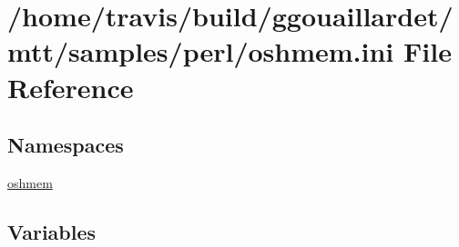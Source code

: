 \hypertarget{oshmem_8ini}{\section{/home/travis/build/ggouaillardet/mtt/samples/perl/oshmem.ini File Reference}
\label{oshmem_8ini}
}
\subsection*{Namespaces}
\begin{DoxyCompactItemize}
\item 
\hyperlink{namespaceoshmem}{oshmem}
\end{DoxyCompactItemize}
\subsection*{Variables}
